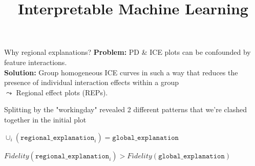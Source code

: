\documentclass[10pt,compress,t,notes=noshow,xcolor=table]{beamer}
\title{Interpretable Machine Learning}
\begin{document}







\begin{framev}[align=top]{Why regional explanations?}
\textbf{Problem:} PD \& ICE plots can be confounded by feature interactions.\\
\textbf{Solution:} Group homogeneous ICE curves in such a way that reduces the presence of individual interaction effects within a group \\$\leadsto$ Regional effect plots (REPs).
\noindent\makebox[\linewidth]{\rule{\textwidth}{0.4pt}}
\spacer[0]
\begin{itemizeM}
\item Splitting by the "workingday" revealed 2 different patterns that we're clashed together in the initial plot
\item $\cup_i (\texttt{regional\_explanation}_i) = \texttt{global\_explanation} $
\item $Fidelity (\texttt{regional\_explanation}_i ) > Fidelity(\texttt{global\_explanation} ) $
\end{itemizeM}
\end{framev}
\end{document}
